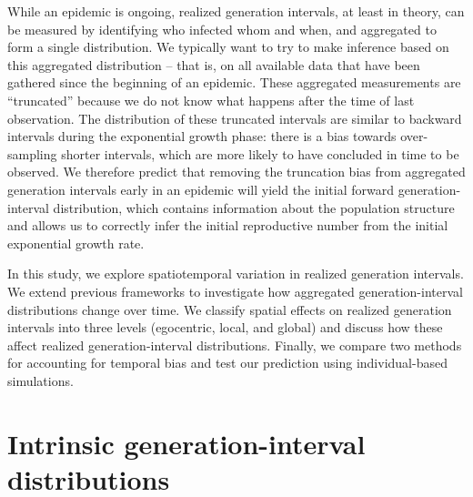 \documentclass[12pt]{article}
\begin{document}
While an epidemic is ongoing, realized generation intervals, at least in theory, can be measured by identifying who infected whom and when, and aggregated to form a single distribution.
We typically want to try to make inference based on this aggregated distribution -- that is, on all available data that have been gathered since the beginning of an epidemic.
These aggregated measurements are ``truncated'' because we do not know what happens after the time of last observation.
The distribution of these truncated intervals are similar to backward intervals during the exponential growth phase: there is a bias towards over-sampling shorter intervals, which are more likely to have concluded in time to be observed.
We therefore predict that removing the truncation bias from aggregated generation intervals early in an epidemic will yield the initial forward generation-interval distribution, which contains information about the population structure and allows us to correctly infer the initial reproductive number from the initial exponential growth rate.

In this study, we explore spatiotemporal variation in realized generation intervals.
We extend previous frameworks to investigate how aggregated generation-interval distributions change over time.
We classify spatial effects on realized generation intervals into three levels (egocentric, local, and global) and discuss how these affect realized generation-interval distributions.
Finally, we compare two methods for accounting for temporal bias and test our prediction using individual-based simulations.

\section{Intrinsic generation-interval distributions}
\end{document}
